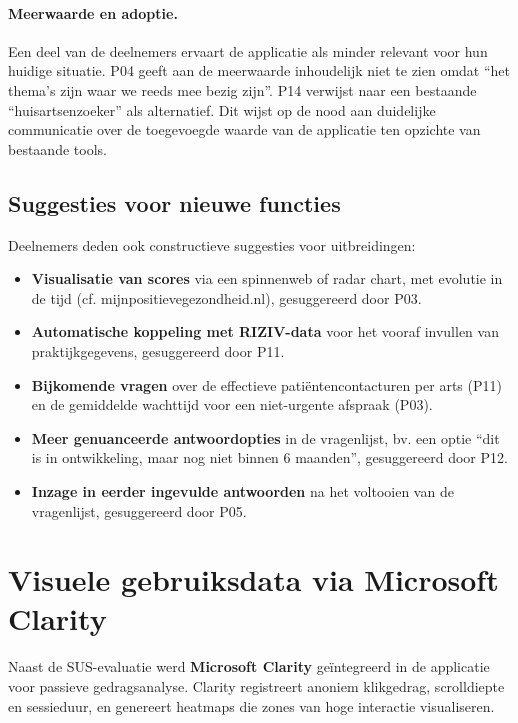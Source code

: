 \paragraph{Meerwaarde en adoptie.}
Een deel van de deelnemers ervaart de applicatie als minder relevant voor hun huidige situatie.
P04 geeft aan de meerwaarde inhoudelijk niet te zien omdat ``het thema's zijn waar we reeds mee bezig zijn''.
P14 verwijst naar een bestaande ``huisartsenzoeker'' als alternatief.
Dit wijst op de nood aan duidelijke communicatie over de toegevoegde waarde van de applicatie ten opzichte van bestaande tools.
 
\subsection{Suggesties voor nieuwe functies}
\label{subsec:functies}
 
Deelnemers deden ook constructieve suggesties voor uitbreidingen:
\begin{itemize}
    \item \textbf{Visualisatie van scores} via een spinnenweb of radar chart, met evolutie in de tijd (cf. mijnpositievegezondheid.nl), gesuggereerd door P03.
    \item \textbf{Automatische koppeling met RIZIV-data} voor het vooraf invullen van praktijkgegevens, gesuggereerd door P11.
    \item \textbf{Bijkomende vragen} over de effectieve patiëntencontacturen per arts (P11) en de gemiddelde wachttijd voor een niet-urgente afspraak (P03).
    \item \textbf{Meer genuanceerde antwoordopties} in de vragenlijst, bv. een optie ``dit is in ontwikkeling, maar nog niet binnen 6 maanden'', gesuggereerd door P12.
    \item \textbf{Inzage in eerder ingevulde antwoorden} na het voltooien van de vragenlijst, gesuggereerd door P05.
\end{itemize}

\section{Visuele gebruiksdata via Microsoft Clarity}
\label{sec:clarity}
 
Naast de SUS-evaluatie werd \textbf{Microsoft Clarity} geïntegreerd in de applicatie voor passieve gedragsanalyse.
Clarity registreert anoniem klikgedrag, scrolldiepte en sessieduur, en genereert heatmaps die zones van hoge interactie visualiseren.

